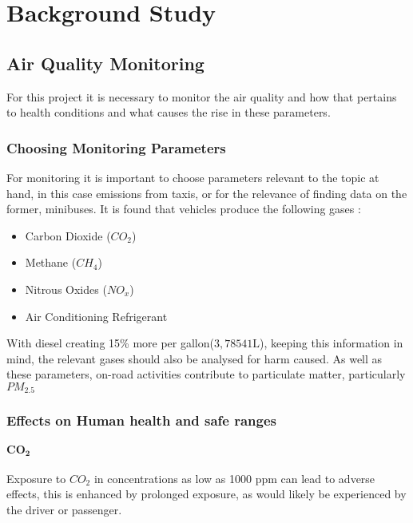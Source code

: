 \chapter{Background Study}







\section{Air Quality Monitoring}
For this project it is necessary to monitor the air quality and how that pertains to health conditions and what causes the rise in these parameters.
\subsection{Choosing Monitoring Parameters}
For monitoring it is important to choose parameters relevant to the topic at hand, in this case emissions from taxis, or for the relevance of finding data on the former, minibuses. It is found that vehicles produce the following gases\cite{gasfromvehicles}  :

\begin{itemize}
	\item Carbon Dioxide ($CO_2$)
	\item Methane ($CH_4$)
	\item Nitrous Oxides ($NO_x$)
	\item Air Conditioning Refrigerant
\end{itemize}

\noindent With diesel creating 15\% more per gallon($3,78541\si{\liter}$), keeping this information in mind, the relevant gases should also be analysed for harm caused.
\noindent
As well as these parameters, on-road activities contribute to particulate matter, particularly $PM_{2.5}$ \cite{particulatematter}


\subsection{Effects on Human health and safe ranges}

\subsubsection{$\mathbf{CO_2}$}
Exposure to $CO_2$ in concentrations as low as 1000 ppm can lead to adverse effects\cite{healthrisksco2}, this is enhanced by prolonged exposure, as would likely be experienced by the driver or passenger. 


